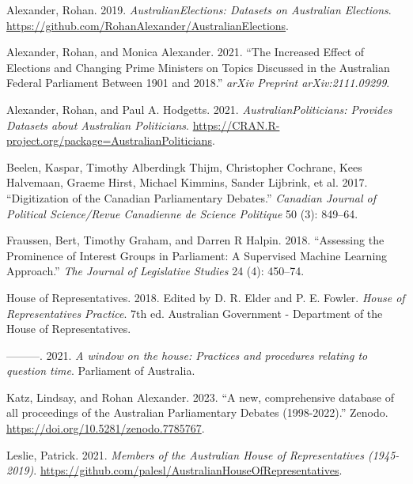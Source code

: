 \documentclass[
  letterpaper,
  DIV=11,
  numbers=noendperiod]{scrartcl}
\newlength{\cslhangindent}
\newlength{\cslentryspacingunit} %
\newenvironment{CSLReferences}[2] %
 {%
  \setlength{\parindent}{0pt}
  \ifodd #1
  \let\oldpar\par
  \def\par{\hangindent=\cslhangindent\oldpar}
  \fi
  \setlength{\parskip}{#2\cslentryspacingunit}
 }%
 {}
\begin{document}
\hypertarget{refs}{}
\begin{CSLReferences}{1}{0}
\leavevmode{}%
Alexander, Rohan. 2019. \emph{AustralianElections: Datasets on
Australian Elections}.
\url{https://github.com/RohanAlexander/AustralianElections}.

\leavevmode{}%
Alexander, Rohan, and Monica Alexander. 2021. {``The Increased Effect of
Elections and Changing Prime Ministers on Topics Discussed in the
Australian Federal Parliament Between 1901 and 2018.''} \emph{arXiv
Preprint arXiv:2111.09299}.

\leavevmode{}%
Alexander, Rohan, and Paul A. Hodgetts. 2021.
\emph{AustralianPoliticians: Provides Datasets about Australian
Politicians}.
\url{https://CRAN.R-project.org/package=AustralianPoliticians}.

\leavevmode{}%
Beelen, Kaspar, Timothy Alberdingk Thijm, Christopher Cochrane, Kees
Halvemaan, Graeme Hirst, Michael Kimmins, Sander Lijbrink, et al. 2017.
{``Digitization of the Canadian Parliamentary Debates.''} \emph{Canadian
Journal of Political Science/Revue Canadienne de Science Politique} 50
(3): 849--64.

\leavevmode{}%
Fraussen, Bert, Timothy Graham, and Darren R Halpin. 2018. {``Assessing
the Prominence of Interest Groups in Parliament: A Supervised Machine
Learning Approach.''} \emph{The Journal of Legislative Studies} 24 (4):
450--74.

\leavevmode{}%
House of Representatives. 2018. Edited by D. R. Elder and P. E. Fowler.
\emph{{House of Representatives Practice}}. 7th ed. {Australian
Government - Department of the House of Representatives}.

\leavevmode{}%
---------. 2021. \emph{{A window on the house: Practices and procedures
relating to question time}}. {Parliament of Australia}.

\leavevmode{}%
Katz, Lindsay, and Rohan Alexander. 2023. {``{A new, comprehensive
database of all proceedings of the Australian Parliamentary Debates
(1998-2022)}.''} Zenodo. \url{https://doi.org/10.5281/zenodo.7785767}.

\leavevmode{}%
Leslie, Patrick. 2021. \emph{Members of the Australian House of
Representatives (1945-2019)}.
\url{https://github.com/palesl/AustralianHouseOfRepresentatives}.


\end{CSLReferences}
\end{document}
